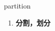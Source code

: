 
\begin{frame}
{\huge partition}
\begin{center}
\begin{enumerate}\Large
  \item \textbf{分割，划分}
\end{enumerate}
\end{center}
\end{frame}
